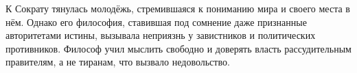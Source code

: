 
К Сократу тянулась молодёжь, стремившаяся к пониманию мира и своего места в нём. Однако его философия, ставившая под сомнение даже признанные авторитетами истины, вызывала неприязнь у завистников и политических противников. Философ учил мыслить свободно и доверять власть рассудительным правителям, а не тиранам, что вызвало недовольство.

